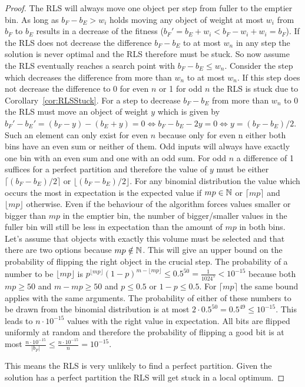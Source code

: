 \begin{proof}
    The RLS will always move one object per step from fuller to the emptier bin.
    As long as $b_F-b_E>w_i$ holds moving any object of weight at most $w_i$ from $b_F$ to $b_E$ results in a decrease of the fitness ($b_F'=b_E+w_i<b_F-w_i+w_i=b_F$).
    If the RLS does not decrease the difference $b_F-b_E$ to at most $w_n$ in any step the solution is never optimal and the RLS therefore must be stuck.
    So now assume the RLS eventually reaches a search point with $b_F-b_E\le w_n$.
    Consider the step which decreases the difference from more than $w_n$ to at most $w_n$.
    If this step does not decrease the difference to 0 for even $n$ or 1 for odd $n$ the RLS is stuck due to Corollary~\ref{cor:RLSStuck}.
    For a step to decrease $b_F-b_E$ from more than $w_n$ to 0 the RLS must move an object of weight $y$ which is given by $b_F'-b_E'=(b_F-y)-(b_E+y)=0\Leftrightarrow b_F-b_E-2y=0\Leftrightarrow y=(b_F-b_E)/2$.
    Such an element can only exist for even $n$ because only for even n either both bins have an even sum or neither of them.
    Odd inputs will always have exactly one bin with an even sum and one with an odd sum.
    For odd $n$ a difference of 1 suffices for a perfect partition and therefore the value of $y$ must be either $\lceil(b_F-b_E)/2\rceil$ or $\lfloor(b_F-b_E)/2\rfloor$.
    For any binomial distribution the value which occurs the most in expectation is the expected value if $mp\in\mathbb{N}$ or $\lceil mp\rceil$ and $\lfloor mp\rfloor$ otherwise.
    Even if the behaviour of the algorithm forces values smaller or bigger than $mp$ in the emptier bin, the number of bigger/smaller values in the fuller bin will still be less in expectation than the amount of $mp$ in both bins.
    Let's assume that objects with exactly this volume must be selected and that there are two options because $mp\notin\mathbb{N}$.
    This will give an upper bound on the probability of flipping the right object in the crucial step.
    The probability of a number to be $\lfloor mp\rfloor$ is $p^{\lfloor mp\rfloor}{(1-p)}^{m-\lfloor mp\rfloor}\le0.5^{50}=\frac{1}{1024^5}<10^{-15}$ because both $mp\ge50$ and $m-mp\ge50$ and $p\le0.5$ or $1-p\le0.5$.
    For $\lceil mp\rceil$ the same bound applies with the same arguments.
    The probability of either of these numbers to be drawn from the binomial distribution is at most $2\cdot 0.5^{50}=0.5^{49}\le10^{-15}$.
    This leads to $n\cdot 10^{-15}$ values with the right value in expectation.
    All bits are flipped uniformly at random and therefore the probability of flipping a good bit is at most
    \(\frac{n\cdot 10^{-15}}{|b_F|}\le \frac{n\cdot 10^{-15}}{n} =10^{-15}\).


    This means the RLS is very unlikely to find a perfect partition.
    Given the solution has a perfect partition the RLS will get stuck in a local optimum.
\end{proof}

